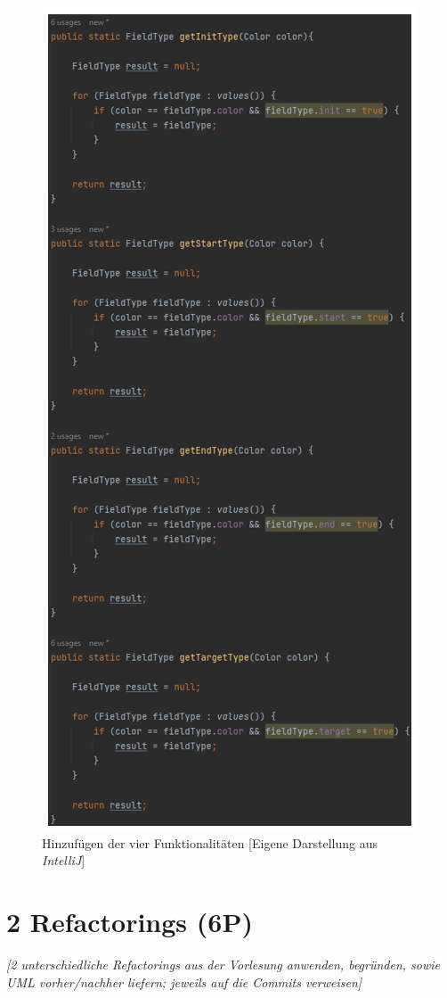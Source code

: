 \begin{figure}[htbp]
\centering
\centerline{\includegraphics[scale=.8]{functionalities}}
\caption{Hinzufügen der vier Funktionalitäten [Eigene Darstellung aus \emph{IntelliJ}]}
\label{fig:funtionalities}
\end{figure}

\newpage
\section{2 Refactorings (6P)}
\emph{[2 unterschiedliche Refactorings aus der Vorlesung anwenden, begründen, sowie UML vorher/nachher
liefern; jeweils auf die Commits verweisen]}


